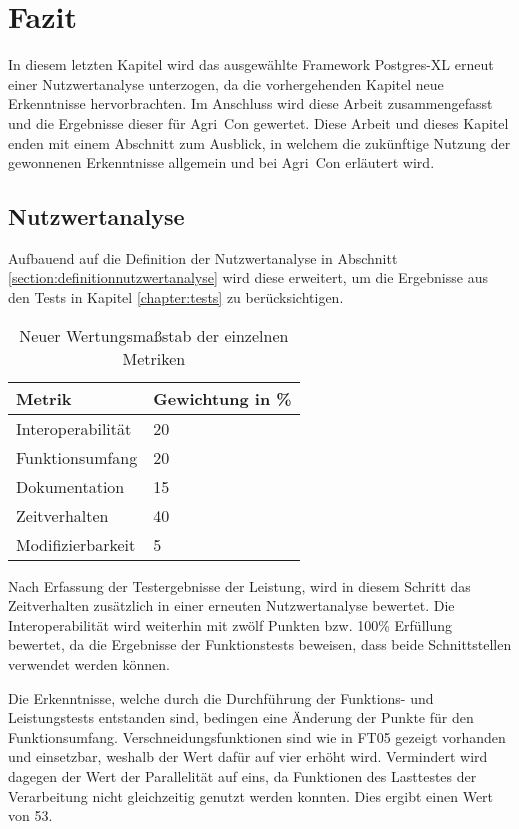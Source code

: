 \chapter{Fazit}
In diesem letzten Kapitel wird das ausgewählte Framework Postgres-XL erneut einer Nutzwertanalyse unterzogen, da die vorhergehenden Kapitel neue Erkenntnisse hervorbrachten.
Im Anschluss wird diese Arbeit zusammengefasst und die Ergebnisse dieser für Agri~Con gewertet.
Diese Arbeit und dieses Kapitel enden mit einem Abschnitt zum Ausblick, in welchem die zukünftige Nutzung der gewonnenen Erkenntnisse allgemein und bei Agri~Con erläutert wird.

\section{Nutzwertanalyse}%
Aufbauend auf die Definition der Nutzwertanalyse in Abschnitt \ref{section:definitionnutzwertanalyse} wird diese erweitert, um die Ergebnisse aus den Tests in Kapitel \ref{chapter:tests} zu berücksichtigen.

\begin{table}[h!]
\centering
\begin{tabular}{l|l}
\textbf{Metrik} & \textbf{Gewichtung in \%} \\ \hline
Interoperabilität & 20 \\ \hline
Funktionsumfang & 20 \\ \hline
Dokumentation & 15 \\ \hline
Zeitverhalten & 40 \\ \hline
Modifizierbarkeit & 5
\end{tabular}
\caption{Neuer Wertungsmaßstab der einzelnen Metriken}
\label{table:Wertungsmassstab2}
\end{table}
Nach Erfassung der Testergebnisse der Leistung, wird in diesem Schritt das Zeitverhalten zusätzlich in einer erneuten Nutzwertanalyse bewertet.
Die Interoperabilität wird weiterhin mit zwölf Punkten bzw. 100\%{} Erfüllung bewertet, da die Ergebnisse der Funktionstests beweisen, dass beide Schnittstellen verwendet werden können.

Die Erkenntnisse, welche durch die Durchführung der Funktions- und Leistungstests entstanden sind, bedingen eine Änderung der Punkte für den Funktionsumfang.
Verschneidungsfunktionen sind wie in FT05 gezeigt vorhanden und einsetzbar, weshalb der Wert dafür auf vier erhöht wird.
Vermindert wird dagegen der Wert der Parallelität auf eins, da Funktionen des Lasttestes der Verarbeitung nicht gleichzeitig genutzt werden konnten.
Dies ergibt einen Wert von 53.

